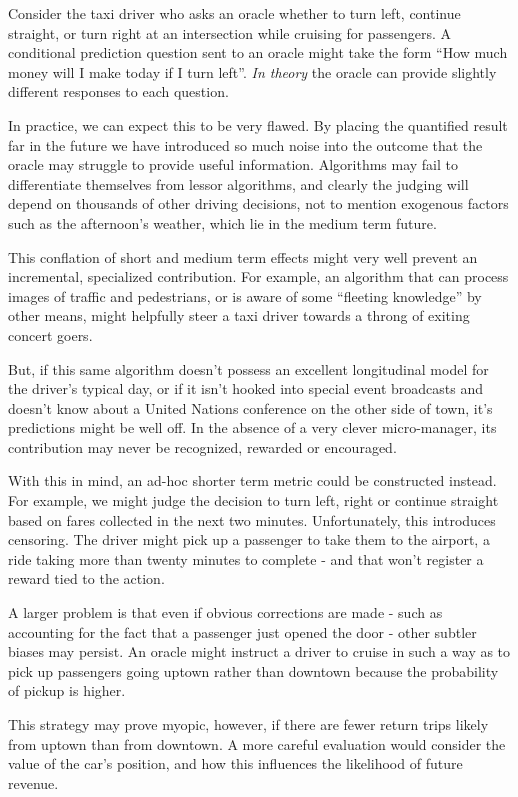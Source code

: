 Consider the taxi driver who asks an oracle whether to turn left, continue straight, or turn right at an intersection while cruising for passengers. A conditional prediction question sent to an oracle might take the form ``How much money will I make today if I turn left''. {\em In theory} the oracle can provide slightly different responses to each question. 

In practice, we can expect this to be very flawed. By placing the quantified result far in the future we have introduced so much noise into the outcome that the oracle may struggle to provide useful information. Algorithms may fail to differentiate themselves from lessor algorithms, and clearly the judging will depend on thousands of other driving decisions, not to mention exogenous factors such as the afternoon's weather, which lie in the medium term future. 

This conflation of short and medium term effects might very well prevent an incremental, specialized contribution. For example, an algorithm that can process images of traffic and pedestrians, or is aware of some ``fleeting knowledge'' by other means, might helpfully steer a taxi driver towards a throng of exiting concert goers. 

But, if this same algorithm doesn't possess an excellent longitudinal model for the driver's typical day, or if it isn't hooked into special event broadcasts and doesn't know about a United Nations conference on the other side of town, it's predictions might be well off. In the absence of a very clever micro-manager, its contribution may never be recognized, rewarded or encouraged. 

With this in mind, an ad-hoc shorter term metric could be constructed instead. For example, we might judge the decision to turn left, right or continue straight based on fares collected in the next two minutes. Unfortunately, this introduces censoring. The driver might pick up a passenger to take them to the airport, a ride taking more than twenty minutes to complete - and that won't register a reward tied to the action. 

A larger problem is that even if obvious corrections are made - such as accounting for the fact that a passenger just opened the door - other subtler biases may persist. An oracle might instruct a driver to cruise in such a way as to pick up passengers going uptown rather than downtown because the probability of pickup is higher. 


This strategy may prove myopic, however, if there are fewer return trips likely from uptown than from downtown. A more careful evaluation would consider the value of the car's position, and how this influences the likelihood of future revenue.   


